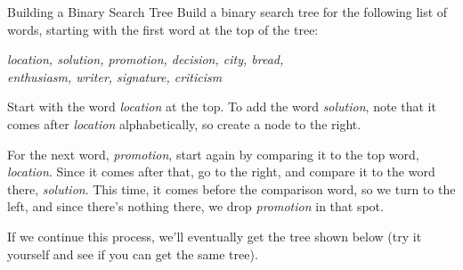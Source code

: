 \begin{example}{Building a Binary Search Tree}
Build a binary search tree for the following list of words, starting with the first word at the top of the tree:
\begin{center}
\emph{location, solution, promotion, decision, city, bread,\\ enthusiasm, writer, signature, criticism}
\end{center}

\sol
Start with the word \emph{location} at the top.  To add the word \emph{solution}, note that it comes after \emph{location} alphabetically, so create a node to the right.
\begin{center}
\end{center}

For the next word, \emph{promotion}, start again by comparing it to the top word, \emph{location}.  Since it comes after that, go to the right, and compare it to the word there, \emph{solution}.  This time, it comes before the comparison word, so we turn to the left, and since there's nothing there, we drop \emph{promotion} in that spot.
\begin{center}
\end{center}

If we continue this process, we'll eventually get the tree shown below (try it yourself and see if you can get the same tree).

\begin{center}
\end{center}
\end{example}
